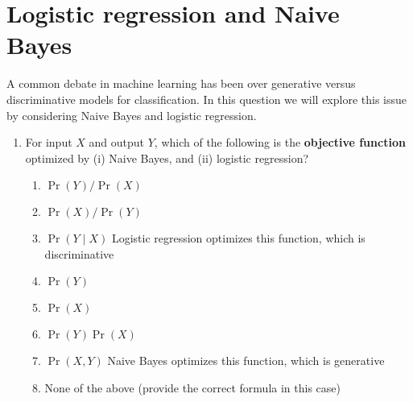\section{Logistic regression and Naive Bayes }

A common debate in machine learning has been over generative versus
discriminative models for classification.  In this question we will
explore this issue by considering Naive Bayes and logistic regression.

\begin{enumerate}
\item  For input $X$ and output $Y$, which of the
  following is the {\bf objective function} optimized by (i) Naive
  Bayes, and (ii) logistic regression?
  \begin{enumerate}
  \item $\Pr(Y) / \Pr(X)$
  \item $\Pr(X) / \Pr(Y)$
  \item $\Pr(Y \mid X)$  Logistic regression optimizes this function, which is discriminative
  \item $\Pr(Y)$
  \item $\Pr(X)$
  \item $\Pr(Y) \Pr(X)$
  \item $\Pr(X, Y)$  Naive Bayes optimizes this function, which is generative
  \item None of the above (provide the correct formula in this case)
  \end{enumerate}



\end{enumerate}
